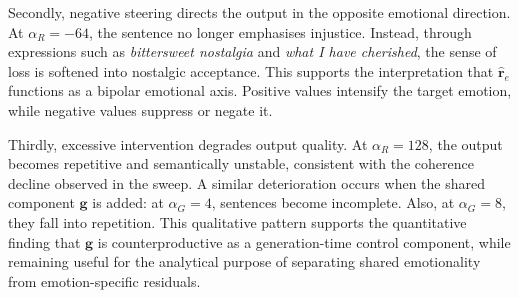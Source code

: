 Secondly, negative steering directs the output in the opposite emotional direction. At $\alpha_R=-64$, the sentence no longer emphasises injustice. Instead, through expressions such as \textit{bittersweet nostalgia} and \textit{what I have cherished}, the sense of loss is softened into nostalgic acceptance. This supports the interpretation that $\hat{\mathbf{r}}_e$ functions as a bipolar emotional axis. Positive values intensify the target emotion, while negative values suppress or negate it.

Thirdly, excessive intervention degrades output quality. At $\alpha_R=128$, the output becomes repetitive and semantically unstable, consistent with the coherence decline observed in the sweep. A similar deterioration occurs when the shared component $\mathbf{g}$ is added: at $\alpha_G=4$, sentences become incomplete. Also, at $\alpha_G=8$, they fall into repetition. This qualitative pattern supports the quantitative finding that $\mathbf{g}$ is counterproductive as a generation-time control component, while remaining useful for the analytical purpose of separating shared emotionality from emotion-specific residuals.

